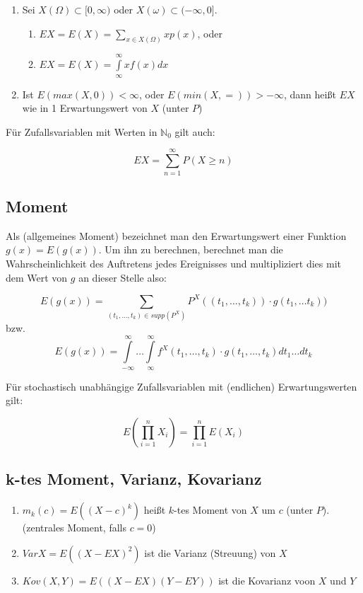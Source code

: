 \documentclass{scrartcl}%
\begin{document}
\begin{enumerate}
	\item{Sei $X(\Omega) \subset [0,\infty)$ oder $X(\omega) \subset (-\infty,0]$.}
		\begin{enumerate}
			\item{$EX = E(X) = \sum\limits_{x \in X(\Omega)} xp(x)$, oder}
			\item{$EX = E(X) = \int\limits_{\infty}^\infty xf(x)dx$}
		\end{enumerate}
	\item{Ist $E(max(X,0)) < \infty$, oder $E(min(X,=)) > -\infty$, dann heißt $EX$ wie in 1 Erwartungswert von $X$ (unter $P$)}
\end{enumerate}
Für Zufallsvariablen mit Werten in $\mathbb{N}_0$ gilt auch:

\[EX = \sum\limits_{n=1}^\infty P(X \geq n)\]

\subsection{Moment}
Als (allgemeines Moment) bezeichnet man den Erwartungswert einer Funktion $g(x) = E(g(x))$. Um ihn zu berechnen, berechnet man die Wahrscheinlichkeit des Auftretens jedes Ereignisses und multipliziert dies mit dem Wert von $g$ an dieser Stelle also:

\[E(g(x)) = \sum\limits_{(t_1,\ldots,t_k) \in supp (P^X)} P^X((t_1,\ldots,t_k)) \cdot g(t_1,\ldots t_k))\]
bzw.
\[E(g(x)) = \int\limits_{-\infty}^\infty \ldots \int\limits_{\infty}^\infty f^X (t_1,\ldots,t_k) \cdot g(t_1,\ldots,t_k) dt_1\ldots dt_k\]

Für stochastisch unabhängige Zufallsvariablen mit (endlichen) Erwartungswerten gilt:

\[E(\prod\limits_{i=1}^n X_i) = \prod\limits_{i=1}^n E(X_i)\]

\subsection{k-tes Moment, Varianz, Kovarianz}
\begin{enumerate}
	\item{$m_k(c) = E((X-c)^k)$ heißt $k$-tes Moment von $X$ um $c$ (unter $P$). (zentrales Moment, falls $c=0$)}
	\item{$Var X = E((X-EX)^2)$ ist die Varianz (Streuung) von $X$}
	\item{$Kov(X,Y) = E((X-EX)(Y-EY))$ ist die Kovarianz voon $X$ und $Y$}
\end{enumerate}
\end{document}
